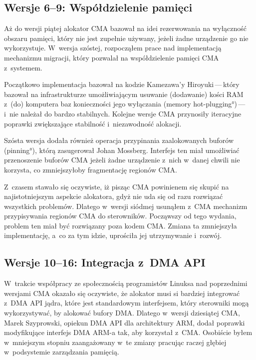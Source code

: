 \subsection{Wersje 6--9: Współdzielenie pamięci}

Aż do wersji piątej alokator CMA bazował na idei rezerwowania na
wyłączność obszaru pamięci, który nie jest zupełnie używany, jeżeli
żadne urządzenie go nie wykorzystuje.  W~wersja szóstej, rozpocząłem
prace nad implementacją mechanizmu migracji, który pozwalał na
współdzielenie pamięci CMA z~systemem.

Początkowo implementacja bazował na kodzie Kamezawa'y
Hiroyuki\,---\,który bazował na infrastrukturze umożliwiającym
usuwanie (dodawanie) kości RAM z~(do) komputera baz konieczności jego
wyłączania (\ang{memory hot-plugging})\,---\,i~nie należał do bardzo
stabilnych.  Kolejne wersje CMA przynosiły iteracyjne poprawki
zwiększające stabilność i~niezawodność alokacji.

Szósta wersja  dodała również operacja przypinania zaalokowanych
buforów (\ang{pinning}), którą zasugerował Johan Mossberg.  Interfejs
ten miał umożliwiać przenoszenie buforów CMA jeżeli żadne urządzenie
z~nich w~danej chwili nie korzysta, co zmniejszyłoby fragmentację
regionów CMA.

Z~czasem stawało się oczywiste, iż pisząc CMA powinienem się skupić na
najistotniejszym aspekcie alokatora, gdyż nie uda się od razu
rozwiązać wszystkich problemów.  Dlatego w~wersji siódmej usunąłem
z~CMA mechanizm przypisywania regionów CMA do sterowników.  Począwszy
od tego wydania, problem ten miał być rozwiązany poza kodem CMA.
Zmiana ta zmniejszyła implementację, a~co za tym idzie, uprościła jej
utrzymywanie i~rozwój.

\subsection{Wersje 10--16: Integracja z~DMA API}

W~trakcie współpracy ze społecznością programistów Linuksa nad
poprzednimi wersjami CMA okazało się oczywiste, że alokator musi si
bardziej integrować z~DMA API jądra, które jest standardowym
interfejsem, który sterowniki mogą wykorzystywać, by alokować bufory
DMA.  Dlatego w~wersji dziesiątej CMA, Marek Szyprowski, opiekun DMA
API dla architektury ARM, dodał poprawki modyfikujące interfejs DMA
ARM-a tak, aby korzystał z~CMA.  Osobiście byłem w~mniejszym stopniu
zaangażowany w~te zmiany pracując raczej głębiej w~podsystemie
zarządzania pamięcią.

